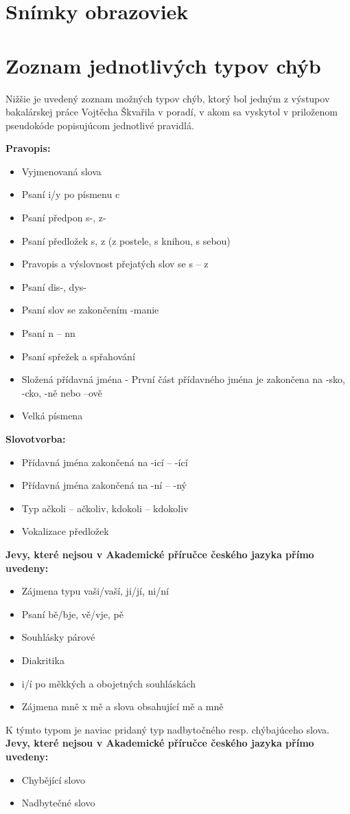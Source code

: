 \documentclass[12pt,oneside]{fithesis2}
\begin{document}
    \chapter{Snímky obrazoviek}
    \chapter{Zoznam jednotlivých typov chýb} \label{typy-chyb}
    \par Nižšie je uvedený zoznam možných typov chýb, ktorý bol jedným z výstupov bakalárskej práce Vojtěcha Škvařila\cite{skvaril14} v poradí, v akom sa vyskytol v priloženom pseudokóde popisujúcom jednotlivé pravidlá.
	\par \bigskip \textbf{Pravopis:}
\begin{itemize}
	\item Vyjmenovaná slova
	\item Psaní i/y po písmenu c
	\item Psaní předpon s-, z-
	\item Psaní předložek s, z (z postele, s knihou, s sebou)
	\item Pravopis a výslovnost přejatých slov se s – z
	\item Psaní dis-, dys-
	\item Psaní slov se zakončením -manie
	\item Psaní n – nn
	\item Psaní spřežek a spřahování
	\item Složená přídavná jména - První část přídavného jména je zakončena na -sko, -cko, -ně nebo –ově
	\item Velká písmena
\end{itemize}
\bigskip
	\textbf{Slovotvorba:}
\begin{itemize}
	\item Přídavná jména zakončená na -icí – -ící
	\item Přídavná jména zakončená na -ní – -ný
	\item Typ ačkoli – ačkoliv, kdokoli – kdokoliv
	\item Vokalizace předložek
\end{itemize}
\bigskip
	\textbf{Jevy, které nejsou v Akademické příručce českého jazyka přímo uvedeny:}
\begin{itemize}
	\item Zájmena typu vaši/vaší, ji/jí, ni/ní
	\item Psaní bě/bje, vě/vje, pě
	\item Souhlásky párové
	\item Diakritika
	\item i/í po měkkých a obojetných souhláskách
	\item Zájmena mně x mě a slova obsahující mě a mně
\end{itemize}

\par K týmto typom je naviac pridaný typ nadbytočného resp. chýbajúceho slova.
	\textbf{Jevy, které nejsou v Akademické příručce českého jazyka přímo uvedeny:}
\begin{itemize}
	\item Chybějící slovo
	\item Nadbytečné slovo
\end{itemize}
    
\end{document}
